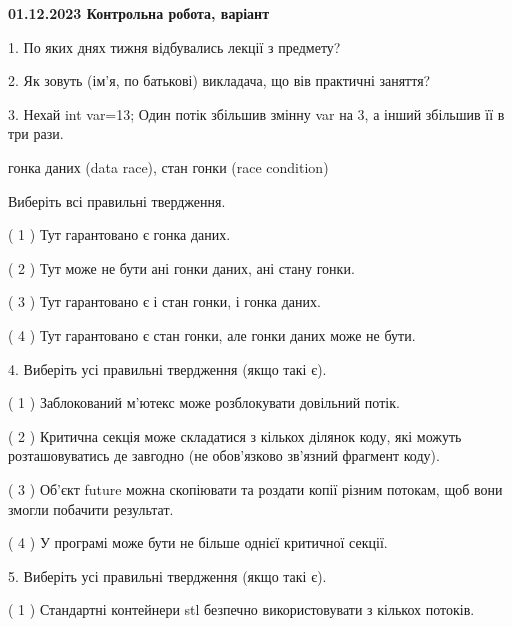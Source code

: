 \documentclass[12pt, ukrainian]{article}
\begin{document}
\vspace{4mm}
\newpage
\begin {large}

\textbf{01.12.2023 Контрольна робота, варіант  }\par


{
1. По яких днях тижня відбувались лекції з предмету?



\vspace{5mm}
2. Як зовуть (ім'я, по батькові) викладача, що вів практичні заняття?



\vspace{5mm}
3. Нехай int var=13; Один потік збільшив змінну var на 3, а інший збільшив її в три рази.

гонка даних (data race), стан гонки (race condition)

Виберіть всі правильні твердження.\par
\vspace{2mm}
( 1 ) Тут гарантовано є гонка даних.%

( 2 ) Тут може не бути ані гонки даних, ані стану гонки.%

( 3 ) Тут гарантовано є і стан гонки, і гонка даних.%

( 4 ) Тут гарантовано є стан гонки, але гонки даних може не бути.%


\vspace{5mm}
4. Виберіть усі правильні твердження (якщо такі є).\par
\vspace{2mm}

( 1 ) Заблокований м’ютекс може розблокувати довільний потік.%

( 2 ) Критична секція може складатися з кількох ділянок коду, які можуть розташовуватись де завгодно (не обов’язково зв’язний фрагмент коду).%

( 3 ) Об’єкт future можна скопіювати та роздати копії різним потокам, щоб вони змогли побачити результат.%

( 4 ) У програмі може бути не більше однієї критичної секції.%


\vspace{5mm}
5. Виберіть усі правильні твердження (якщо такі є).\par
\vspace{2mm}

( 1 ) Стандартні контейнери stl безпечно використовувати з кількох потоків.%

}
\end{large}
\end{document}
